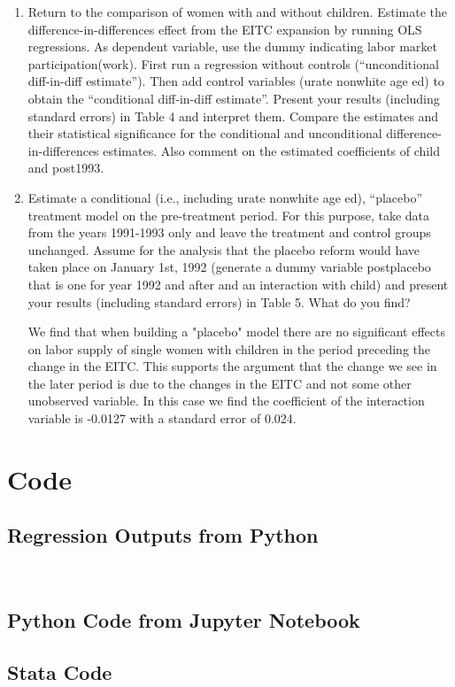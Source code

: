 \documentclass{article}
\begin{document}
\begin{enumerate}[label=\alph*]
\item Return to the comparison of women with and without children. Estimate the difference-in-differences effect from the EITC expansion by running OLS regressions. As dependent variable, use the dummy indicating labor market participation(work). First run a regression without controls (“unconditional diff-in-diff estimate”). Then add control variables (urate nonwhite age ed) to obtain the “conditional diff-in-diff estimate”. Present your results (including standard errors) in Table 4 and interpret them. Compare the estimates and their statistical significance for the conditional and unconditional difference-in-differences estimates. Also comment on the estimated coefficients of child and post1993.



\item Estimate a conditional (i.e., including urate nonwhite age ed), “placebo” treatment model on the pre-treatment period. For this purpose, take data from the years 1991-1993 only and leave the treatment and control groups unchanged. Assume for the analysis that the placebo reform would have taken place on January 1st, 1992 (generate a dummy variable postplacebo that is one for year 1992 and after and an interaction with child) and present your results (including standard errors) in Table 5. What do you find?



We find that when building a "placebo" model there are no significant effects on labor supply of single women with children in the period preceding the change in the EITC.  This supports the argument that the change we see in the later period is due to the changes in the EITC and not some other unobserved variable.  In this case we find the coefficient of the interaction variable is -0.0127 with a standard error of 0.024.

\end{enumerate}

\section{Code}

\subsection{Regression Outputs from Python}





​

\subsection{Python Code from Jupyter Notebook}





\subsection{Stata Code}


\end{document}
